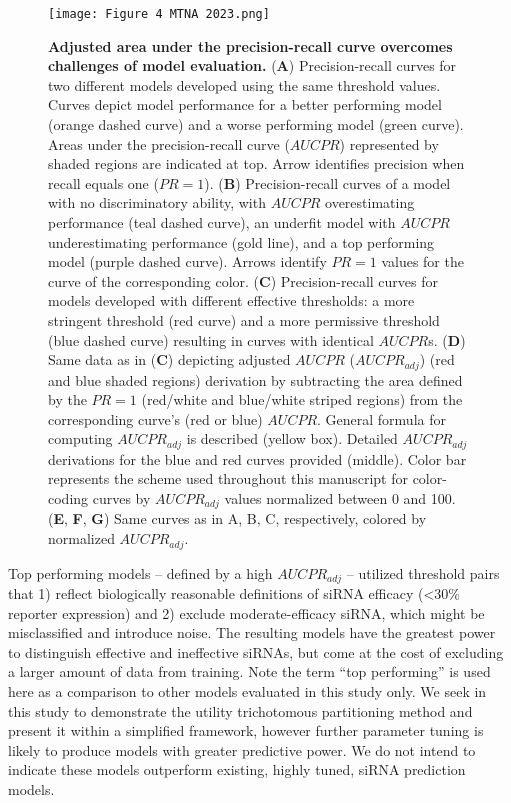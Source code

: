 \documentclass{report}
\begin{document}
\begin{figure}
    \centering
    \texttt{[image: Figure 4 MTNA 2023.png]}
    \caption{\textbf{Adjusted area under the precision-recall curve overcomes challenges of model evaluation.} (\textbf{A}) Precision-recall curves for two different models developed using the same threshold values. Curves depict model performance for a better performing model (orange dashed curve) and a worse performing model (green curve). Areas under the precision-recall curve ($AUCPR$) represented by shaded regions are indicated at top. Arrow identifies precision when recall equals one ($PR=1$). (\textbf{B}) Precision-recall curves of a model with no discriminatory ability, with $AUCPR$ overestimating performance (teal dashed curve), an underfit model with $AUCPR$ underestimating performance (gold line), and a top performing model (purple dashed curve). Arrows identify $PR=1$ values for the curve of the corresponding color. (\textbf{C}) Precision-recall curves for models developed with different effective thresholds: a more stringent threshold (red curve) and a more permissive threshold (blue dashed curve) resulting in curves with identical $AUCPR$s. (\textbf{D}) Same data as in (\textbf{C}) depicting adjusted $AUCPR$ ($AUCPR_{adj}$) (red and blue shaded regions) derivation by subtracting the area defined by the $PR=1$ (red/white and blue/white striped regions) from the corresponding curve’s (red or blue) $AUCPR$. General formula for computing $AUCPR_{adj}$ is described (yellow box). Detailed $AUCPR_{adj}$ derivations for the blue and red curves provided (middle). Color bar represents the scheme used throughout this manuscript for color-coding curves by $AUCPR_{adj}$ values normalized between 0 and 100. (\textbf{E}, \textbf{F}, \textbf{G}) Same curves as in A, B, C, respectively, colored by normalized $AUCPR_{adj}$.}
    \label{fig:Figure* 4}
\end{figure}

 Top performing models – defined by a high $AUCPR_{adj}$ – utilized threshold pairs that 1) reflect biologically reasonable definitions of siRNA efficacy (<30\% reporter expression) and 2) exclude moderate-efficacy siRNA, which might be misclassified and introduce noise. The resulting models have the greatest power to distinguish effective and ineffective siRNAs, but come at the cost of excluding a larger amount of data from training. Note the term “top performing” is used here as a comparison to other models evaluated in this study only. We seek in this study to demonstrate the utility trichotomous partitioning method and present it within a simplified framework, however further parameter tuning is likely to produce models with greater predictive power. We do not intend to indicate these models outperform existing, highly tuned, siRNA prediction models.
\end{document}
